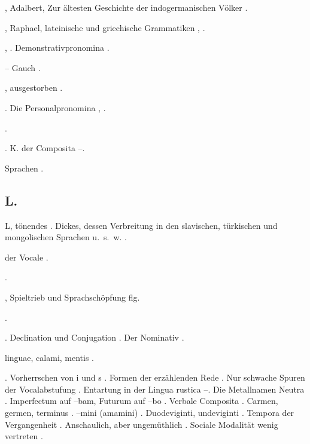 \begin{register}
, Adalbert, Zur ältesten Geschichte der indogermanischen Völker \pageref{sp.294}.


, Raphael, lateinische und griechische Grammatiken \pageref{sp.111}, \pageref{sp.112}.

 \pageref{sp.149}, \pageref{sp.257}. Demonstrativpronomina \pageref{sp.408}.

 – Gauch \pageref{sp.208}.

, ausgestorben \pageref{sp.146}.

 \pageref{sp.160}. Die Personalpronomina \pageref{sp.379}, \pageref{sp.408}.

 \pageref{sp.130}.

 \pageref{sp.101}. K. der Composita \pageref{sp.235}–\pageref{sp.236}. 

 Sprachen \pageref{sp.282}.

\subsection*{L.}\label{reg.L}

L, tönendes \pageref{sp.186}. Dickes, dessen Verbreitung in den slavischen, türkischen und mongolischen Sprachen u.~s.~w. \pageref{sp.269}.


 der Vocale \pageref{sp.37}.

 \pageref{sp.36}.




, Spieltrieb und Sprachschöpfung \pageref{sp.308} flg.

 \pageref{sp.149}\sed{, \pageref{sp.257}, \pageref{sp.426}}.

. Declination und Conjugation \pageref{sp.350}.  Der Nominativ \pageref{sp.391}.

 linguae, calami, mentis \pageref{sp.43}.

. Vorherrschen von i und s \pageref{sp.34}. Formen der erzählenden Rede \pageref{sp.99}. Nur schwache Spuren der Vocalabstufung \pageref{sp.149}. Entartung in der Lingua rustica \pageref{sp.182}–\pageref{sp.183}.  Die Metallnamen Neutra \pageref{sp.237}. Imperfectum auf –bam, Futurum auf –bo \pageref{sp.241}. Verbale Composita \pageref{sp.243}. Carmen, germen, terminus \pageref{sp.292}. –mini (amamini) \pageref{sp.384}. Duodeviginti, undeviginti \pageref{sp.401}. Tempora der Vergangenheit \pageref{sp.409}. Anschaulich, aber ungemüthlich \pageref{sp.473}. Sociale Modalität wenig vertreten \pageref{sp.474}.


\end{register}
